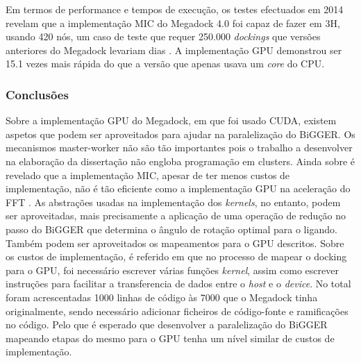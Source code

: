 Em termos de performance e tempos de execução, os testes efectuados em 2014 revelam que a implementação MIC do Megadock 4.0 foi capaz de fazer em 3H, usando 420 nós, um caso de teste que requer 250.000 \textit{dockings} que versões anteriores do Megadock levariam dias \cite{megadock40}. A implementação GPU demonstrou ser 15.1 vezes mais rápida do que a versão que apenas usava um \textit{core} do CPU.
\subsubsection{Conclusões}
Sobre a implementação GPU do Megadock, em que foi usado CUDA, existem aspetos que podem ser aproveitados para ajudar na paralelização do BiGGER. Os mecanismos master-worker não são tão importantes pois o trabalho a desenvolver na elaboração da dissertação não engloba programação em clusters. Ainda sobre \cite{shimoda2015protein} é revelado que a implementação MIC, apesar de ter menos custos de implementação, não é tão eficiente como a implementação GPU na aceleração do FFT . As abstrações usadas na implementação dos \textit{kernels}, no entanto, podem ser aproveitadas, mais precisamente a aplicação de uma operação de redução no passo do BiGGER que determina o ângulo de rotação optimal para o ligando. Também podem ser aproveitados os mapeamentos para o GPU descritos. Sobre os custos de implementação, é referido em \cite{shimoda2015protein} que no processo de mapear o docking para o GPU, foi necessário escrever várias funções\textit{ kernel}, assim como escrever instruções para facilitar a transferencia de dados entre o \textit{host} e o \textit{device}. No total foram acrescentadas 1000 linhas de código às 7000 que o Megadock tinha originalmente, sendo necessário adicionar ficheiros de código-fonte e ramificações no código. Pelo que é esperado que desenvolver a paralelização do BiGGER mapeando etapas do mesmo para o GPU tenha um nível similar de custos de implementação. 

